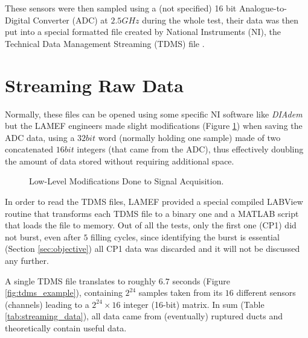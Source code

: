 These sensors were then sampled using a (not specified) 16 bit Analogue-to-Digital Converter (ADC) at $2.5 GHz$ during the whole test, their data was then put into a special formatted file created by National Instruments (NI), the Technical Data  Management Streaming (TDMS) file \cite{nationalinstrumentsNITDMSFile}. 


\section{Streaming Raw Data}

Normally, these files can be opened using some specific NI software like \textit{DIAdem} but the LAMEF engineers made slight modifications (Figure \ref{fig:lamef_mods}) when saving the ADC data, using a $32 bit$ word (normally holding one sample) made of two concatenated $16 bit$ integers (that came from the ADC), thus effectively doubling the amount of data stored without requiring additional space.

\begin{figure}[H]
	\centering
	\def\svgwidth{0.7\columnwidth}
	
	\caption{Low-Level Modifications Done to Signal Acquisition.}
	\label{fig:lamef_mods}
\end{figure}


In order to read the TDMS files, LAMEF provided a special compiled LABView routine that transforms each TDMS file to a binary one and a MATLAB script that loads the file to memory. Out of all the tests, only the first one (CP1) did not burst, even after $5$ filling cycles, since identifying the burst is essential (Section \ref{sec:objective}) all CP1 data was discarded and it will not be discussed any further.

A single TDMS file translates to roughly $6.7$ seconds (Figure \ref{fig:tdms_example}), containing $2^{24}$ samples taken from its $16$ different sensors (channels) leading to a $2^{24} \times 16$ integer (16-bit) matrix. In sum (Table \ref{tab:streaming_data}), all data came from (eventually) ruptured ducts and theoretically contain useful data.

